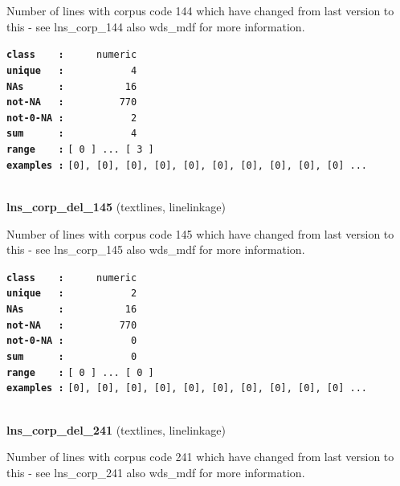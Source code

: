 \documentclass[]{article}
\begin{document}
Number of lines with corpus code 144 which have changed from last
version to this - see lns\_corp\_144 also wds\_mdf for more information.

\textbf{\texttt{class\ \ \ \ :}} \texttt{~~~~~numeric}\\
\textbf{\texttt{unique\ \ \ :}} \texttt{~~~~~~~~~~~4}\\
\textbf{\texttt{NAs\ \ \ \ \ \ :}} \texttt{~~~~~~~~~~16}\\
\textbf{\texttt{not-NA\ \ \ :}} \texttt{~~~~~~~~~770}\\
\textbf{\texttt{not-0-NA\ :}} \texttt{~~~~~~~~~~~2}\\
\textbf{\texttt{sum\ \ \ \ \ \ :}} \texttt{~~~~~~~~~~~4}\\
\textbf{\texttt{range\ \ \ \ :}}
\texttt{{[}\ 0\ {]}\ ...\ {[}\ 3\ {]}}\\
\textbf{\texttt{examples\ :}}
\texttt{{[}0{]},\ {[}0{]},\ {[}0{]},\ {[}0{]},\ {[}0{]},\ {[}0{]},\ {[}0{]},\ {[}0{]},\ {[}0{]},\ {[}0{]}\ ...}\\

~

\textbf{lns\_corp\_del\_145} (textlines, linelinkage)

Number of lines with corpus code 145 which have changed from last
version to this - see lns\_corp\_145 also wds\_mdf for more information.

\textbf{\texttt{class\ \ \ \ :}} \texttt{~~~~~numeric}\\
\textbf{\texttt{unique\ \ \ :}} \texttt{~~~~~~~~~~~2}\\
\textbf{\texttt{NAs\ \ \ \ \ \ :}} \texttt{~~~~~~~~~~16}\\
\textbf{\texttt{not-NA\ \ \ :}} \texttt{~~~~~~~~~770}\\
\textbf{\texttt{not-0-NA\ :}} \texttt{~~~~~~~~~~~0}\\
\textbf{\texttt{sum\ \ \ \ \ \ :}} \texttt{~~~~~~~~~~~0}\\
\textbf{\texttt{range\ \ \ \ :}}
\texttt{{[}\ 0\ {]}\ ...\ {[}\ 0\ {]}}\\
\textbf{\texttt{examples\ :}}
\texttt{{[}0{]},\ {[}0{]},\ {[}0{]},\ {[}0{]},\ {[}0{]},\ {[}0{]},\ {[}0{]},\ {[}0{]},\ {[}0{]},\ {[}0{]}\ ...}\\

~

\textbf{lns\_corp\_del\_241} (textlines, linelinkage)

Number of lines with corpus code 241 which have changed from last
version to this - see lns\_corp\_241 also wds\_mdf for more information.
\end{document}
